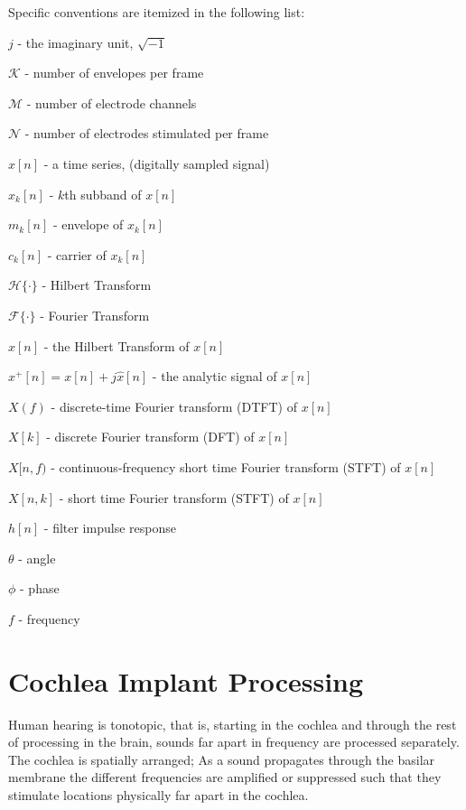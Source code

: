 \documentclass [11pt, proquest,oneside] {ganter_thesis}[2015/03/03]
\begin{document}
Specific conventions are itemized in the following list:

$j$ - the imaginary unit, $\sqrt{-1}$

$\mathcal{K}$ - number of envelopes per frame

$\mathcal{M}$ - number of electrode channels

$\mathcal{N}$ - number of electrodes stimulated per frame

$x[n]$ - a time series, (digitally sampled signal)

$x_k[n]$ - $k$th subband of $x[n]$

$m_k[n]$ - envelope of $x_k[n]$

$c_k[n]$ - carrier of $x_k[n]$

$\mathcal{H}\{\cdot\}$ - Hilbert Transform

$\mathcal{F}\{\cdot\}$ - Fourier Transform

$\widehat{x}[n]$ - the Hilbert Transform of $x[n]$

$x^+[n] = x[n] + j\widehat{x}[n]$ - the analytic signal of $x[n]$

$X(f)$ - discrete-time Fourier transform (DTFT) of $x[n]$

$X[k]$ - discrete Fourier transform (DFT) of $x[n]$

$X[n,f)$ - continuous-frequency short time Fourier transform (STFT) of $x[n]$

$X[n,k]$ - short time Fourier transform (STFT) of $x[n]$

$h[n]$ - filter impulse response

$\theta$ - angle

$\phi$ - phase

$f$ - frequency


\chapter{Cochlea Implant Processing}\label{ch:ci_processing}

Human hearing is tonotopic, that is, starting in the cochlea and through the rest of processing in the brain, sounds far apart in frequency are processed separately.  The cochlea is spatially arranged; As a sound propagates through the basilar membrane the different frequencies are amplified or suppressed such that they stimulate locations physically far apart in the cochlea.

\end{document}
